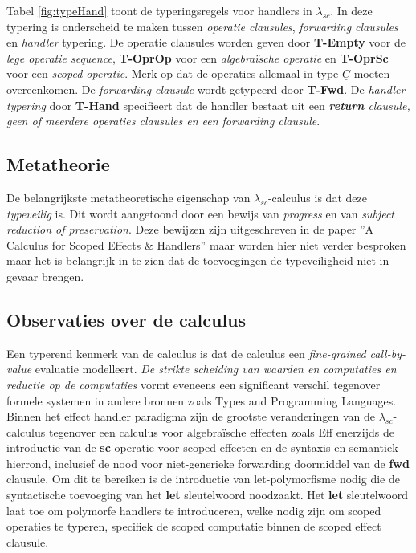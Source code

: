 Tabel \ref{fig:typeHand} toont de typeringsregels voor handlers in $\lambda_{sc}$. In deze typering is onderscheid te maken tussen \emph{operatie clausules}, \emph{forwarding clausules} en \emph{handler} typering. \newline 
De operatie clausules worden geven door \textbf{T-Empty} voor de \emph{lege operatie sequence}, \textbf{T-OprOp} voor een \emph{algebraïsche operatie} en \textbf{T-OprSc} voor een \emph{scoped operatie}. Merk op dat de operaties allemaal in type $\underline{C}$ moeten overeenkomen. \newline
De \emph{forwarding clausule} wordt getypeerd door \textbf{T-Fwd}. \newline
De \emph{handler typering} door \textbf{T-Hand} specifieert dat de handler bestaat uit een \emph{\textbf{return} clausule, geen of meerdere operaties clausules en een forwarding clausule}. 

\subsection{Metatheorie}
De belangrijkste metatheoretische eigenschap van $\lambda_{sc}$-calculus is dat deze \emph{typeveilig} is. Dit wordt aangetoond door een bewijs van \emph{progress} en van \emph{subject reduction of preservation}. Deze bewijzen zijn uitgeschreven in de paper ''A Calculus for Scoped Effects \& Handlers'' \cite{Bosman2022} maar worden hier niet verder besproken maar het is belangrijk in te zien dat de toevoegingen de typeveiligheid niet in gevaar brengen.

\subsection{Observaties over de calculus}
Een typerend kenmerk van de calculus is dat de calculus een \emph{fine-grained call-by-value} evaluatie modelleert. \emph{De strikte scheiding van waarden en computaties en reductie op de computaties} vormt eveneens een significant verschil tegenover formele systemen in andere bronnen zoals Types and Programming Languages\cite{Pierce2002}. \newline
Binnen het effect handler paradigma zijn de grootste veranderingen van de $\lambda_{sc}$-calculus tegenover een calculus voor algebraïsche effecten zoals Eff \cite{Bauer2015} enerzijds de introductie van de \textbf{sc} operatie voor scoped effecten en de syntaxis en semantiek hierrond, inclusief de nood voor niet-generieke forwarding doormiddel van de \textbf{fwd} clausule. Om dit te bereiken is de introductie van let-polymorfisme nodig die de syntactische toevoeging van het \textbf{let} sleutelwoord noodzaakt. Het \textbf{let} sleutelwoord laat toe om polymorfe handlers te introduceren, welke nodig zijn om scoped operaties te typeren, specifiek de scoped computatie binnen de scoped effect clausule.

